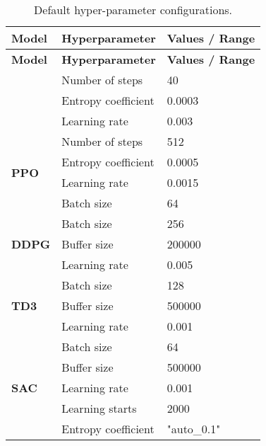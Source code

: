 \begin{longtable}{|l|l|p{8cm}|}
    \hline
    \textbf{Model} & \textbf{Hyperparameter} & \textbf{Values / Range} \\ \midrule
    \endfirsthead

    \hline
    \textbf{Model} & \textbf{Hyperparameter} & \textbf{Values / Range} \\ \midrule
    \endhead

    \caption{Default hyper-parameter configurations.}
    \label{tab:default_hyperparameters}
    \endfoot

    \multirow{3}{*}{\textbf{A2C}}
    & Number of steps & 40 \\
    & Entropy coefficient & 0.0003 \\ 
    & Learning rate & 0.003 \\ \hline


    \multirow{4}{*}{\textbf{PPO}}
    & Number of steps & 512 \\ 
    & Entropy coefficient & 0.0005 \\ 
    & Learning rate & 0.0015 \\ 
    & Batch size & 64 \\ \hline

    \multirow{3}{*}{\textbf{DDPG}}
    & Batch size & 256 \\ 
    & Buffer size & 200000 \\ 
    & Learning rate & 0.005 \\ \hline

    \multirow{3}{*}{\textbf{TD3}}
    & Batch size & 128 \\ 
    & Buffer size & 500000 \\ 
    & Learning rate & 0.001 \\ \hline

    \multirow{5}{*}{\textbf{SAC}}
    & Batch size & 64 \\ 
    & Buffer size & 500000 \\ 
    & Learning rate & 0.001 \\ 
    & Learning starts & 2000 \\ 
    & Entropy coefficient & "auto\_0.1" \\ \hline
    
\end{longtable}